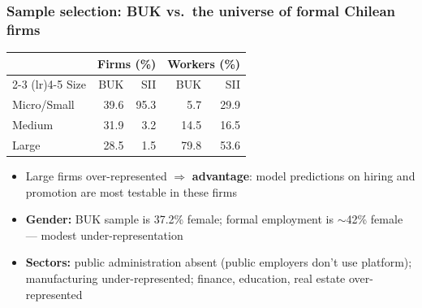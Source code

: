 \documentclass[aspectratio=169, 11pt]{beamer}
\begin{document}
\begin{frame}[label=sampleslide]
\frametitle{Sample selection: BUK vs.\ the universe of formal Chilean firms}

\begin{center}
\small
\begin{tabular}{@{}lrrrr@{}}
\toprule
 & \multicolumn{2}{c}{\textbf{Firms (\%)}} & \multicolumn{2}{c}{\textbf{Workers (\%)}} \\
\cmidrule(lr){2-3} \cmidrule(lr){4-5}
Size & BUK & SII & BUK & SII \\
\midrule
Micro/Small  & 39.6 & 95.3 & 5.7  & 29.9 \\
Medium       & 31.9 &  3.2 & 14.5 & 16.5 \\
Large        & 28.5 &  1.5 & 79.8 & 53.6 \\
\bottomrule
\end{tabular}
\end{center}

\vspace{0.2cm}
\begin{itemize}
    \item Large firms over-represented $\Rightarrow$ \textbf{advantage}: model predictions on hiring and promotion are most testable in these firms %
    \medskip
    \item \textbf{Gender:} BUK sample is 37.2\% female; formal employment is $\sim$42\% female --- modest under-representation

    \medskip
    \item \textbf{Sectors:} public administration absent (public employers don't use platform); manufacturing under-represented; finance, education, real estate over-represented
\end{itemize}
\hfill\hyperlink{coverage-heatmap}{}

\end{frame}

\end{document}
